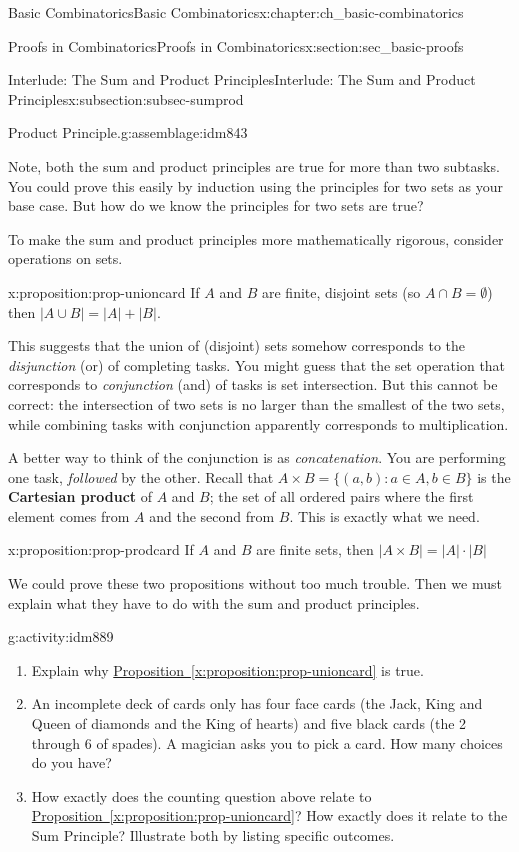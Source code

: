 \documentclass[oneside,10pt,]{book}
\newcommand{\terminology}[1]{\textbf{#1}}
\numberwithin{equation}{chapter}
\def\st{:}
\newcommand{\card}[1]{\left| #1 \right|}
\begin{document}
\begin{chapterptx}{Basic Combinatorics}{}{Basic Combinatorics}{}{}{x:chapter:ch_basic-combinatorics}
\begin{sectionptx}{Proofs in Combinatorics}{}{Proofs in Combinatorics}{}{}{x:section:sec_basic-proofs}
\begin{subsectionptx}{Interlude: The Sum and Product Principles}{}{Interlude: The Sum and Product Principles}{}{}{x:subsection:subsec-sumprod}
\begin{assemblage}{Product Principle.}{g:assemblage:idm843}
\end{assemblage}
Note, both the sum and product principles are true for more than two subtasks.  You could prove this easily by induction using the principles for two sets as your base case.  But how do we know the principles for two sets are true?%
\par
To make the sum and product principles more mathematically rigorous, consider operations on sets.%
\begin{proposition}{}{}{x:proposition:prop-unioncard}%
If \(A\) and \(B\) are finite, disjoint sets (so \(A \cap B = \emptyset\)) then \(\card{A \cup B} = \card{A} + \card{B}\).%
\end{proposition}
This suggests that the union of (disjoint) sets somehow corresponds to the \emph{disjunction} (or) of completing tasks.  You might guess that the set operation that corresponds to \emph{conjunction} (and) of tasks is set intersection.  But this cannot be correct: the intersection of two sets is no larger than the smallest of the two sets, while combining tasks with conjunction apparently corresponds to multiplication.%
\par
A better way to think of the conjunction is as \emph{concatenation}.  You are performing one task, \emph{followed} by the other.  Recall that \(A \times B = \{(a,b) \st a \in A, b \in B\}\) is the \terminology{Cartesian product} of \(A\) and \(B\); the set of all ordered pairs where the first element comes from \(A\) and the second from \(B\).  This is exactly what we need.%
\begin{proposition}{}{}{x:proposition:prop-prodcard}%
If \(A\) and \(B\) are finite sets, then \(\card{A \times B} = \card{A} \cdot \card{B}\)%
\end{proposition}
We could prove these two propositions without too much trouble.  Then we must explain what they have to do with the sum and product principles.%
\begin{activity}{}{g:activity:idm889}%
\begin{enumerate}[font=\bfseries,label=(\alph*),ref=\alph*]
\item{}Explain why \hyperref[x:proposition:prop-unioncard]{Proposition~\ref{x:proposition:prop-unioncard}} is true.%
\item{}An incomplete deck of cards only has four face cards (the Jack, King and Queen of diamonds and the King of hearts) and five black cards (the 2 through 6 of spades).  A magician asks you to pick a card.  How many choices do you have?%
\item{}How exactly does the counting question above relate to \hyperref[x:proposition:prop-unioncard]{Proposition~\ref{x:proposition:prop-unioncard}}?  How exactly does it relate to the Sum Principle?  Illustrate both by listing specific outcomes.%

\end{enumerate}
\end{activity}
\end{subsectionptx}
\end{sectionptx}
\end{chapterptx}
\end{document}
